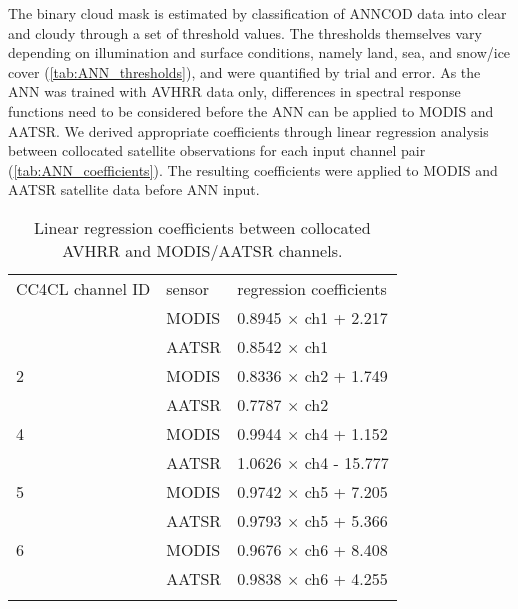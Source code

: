 The binary cloud mask is estimated by classification of ANNCOD data into clear and cloudy through a set of threshold values. The thresholds themselves vary depending on illumination and surface conditions, namely land, sea, and snow/ice cover (\autoref{tab:ANN_thresholds}), and were quantified by trial and error. As the ANN was trained with AVHRR data only, differences in spectral response functions need to be considered before the ANN can be applied to MODIS and AATSR. We derived appropriate coefficients through linear regression analysis between collocated satellite observations for each input channel pair (\autoref{tab:ANN_coefficients}). The resulting coefficients were applied to MODIS and AATSR satellite data before ANN input.

\begin{table}[h]
  \caption{Linear regression coefficients between collocated AVHRR and MODIS/AATSR channels.}
  \begin{tabular}{l|l|l} %
    \tophline
    CC4CL channel ID & sensor & regression coefficients \\
    \middlehline
    1 & MODIS & 0.8945 $\times$ ch1 + 2.217 \\
    & AATSR & 0.8542 $\times$ ch1 \\ \hline
    2 & MODIS & 0.8336 $\times$ ch2 + 1.749 \\
    & AATSR & 0.7787 $\times$ ch2 \\ \hline
    4 & MODIS & 0.9944 $\times$ ch4 + 1.152 \\
    & AATSR & 1.0626 $\times$ ch4 - 15.777 \\ \hline
    5 & MODIS & 0.9742 $\times$ ch5 + 7.205 \\
    & AATSR & 0.9793 $\times$ ch5 + 5.366 \\ \hline
    6 & MODIS & 0.9676 $\times$ ch6 + 8.408 \\
    & AATSR & 0.9838 $\times$ ch6 + 4.255 \\
    \bottomhline
  \end{tabular}
  \label{tab:ANN_coefficients}
\end{table}

